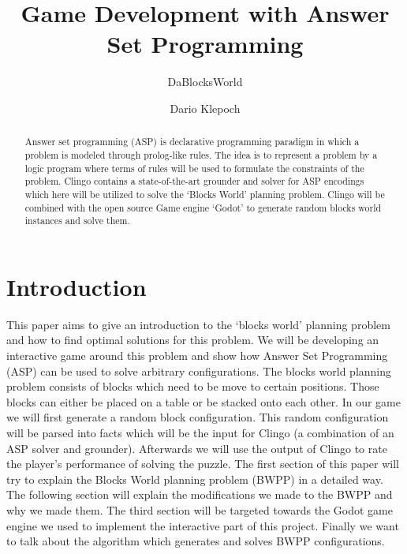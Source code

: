 \documentclass[runningheads]{llncs}
\begin{document}
\lstset{
    language=prolog,
    autogobble=true,
    numbers=left
}

\title{Game Development with Answer Set Programming}
\subtitle{DaBlocksWorld}
\author{Dario Klepoch}
\maketitle        

    \begin{abstract}
        Answer set programming (ASP) is declarative programming paradigm in which a problem is modeled through prolog-like rules.
        The idea is to represent a problem by a logic program where terms of rules will be used to formulate the constraints of the problem.
        Clingo contains a state-of-the-art grounder and solver for ASP encodings
        which here will be utilized to solve the `Blocks World' planning problem.
        Clingo will be combined with the open source Game engine `Godot' to generate random blocks world instances and solve them.
    \end{abstract}


    \section{Introduction}
        This paper aims to give an introduction to the `blocks world' planning problem and how to find optimal solutions for this problem.
        We will be developing an interactive game around this problem and show how Answer Set Programming (ASP) can
        be used to solve arbitrary configurations.\newline
        The blocks world planning problem consists of blocks which need to be move to certain positions.
        Those blocks can either be placed on a table or be stacked onto each other.
        In our game we will first generate a random block configuration.
        This random configuration will be parsed into facts which will be the input for Clingo (a combination of an ASP solver and grounder).
        Afterwards we will use the output of Clingo to rate the player's performance of solving the puzzle.\newline
        The first section of this paper will try to explain the Blocks World planning problem (BWPP) in a detailed way.
        The following section will explain the modifications we made to the BWPP and why we made them.
        The third section will be targeted towards the Godot game engine we used to implement the interactive part of this project.
        Finally we want to talk about the algorithm which generates and solves BWPP configurations.
\end{document}
